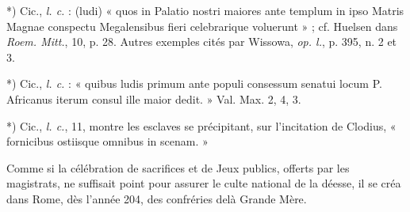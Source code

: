 \documentclass[a4paper, 11pt, oneside, polutonikogreek, french]{article}
\begin{document}
*) Cic., \emph{l. c.} : (ludi) « quos in Palatio nostri maiores ante templum in ipso Matris Magnae conspectu Megalensibus fieri celebrarique voluerunt » ; cf. Huelsen dans \emph{Roem. Mitt.}, 10, p. 28. Autres exemples cités par Wissowa, \emph{op. l.}, p. 395, n. 2 et 3.

*) Cic., \emph{l. c.} : « quibus ludis primum ante populi consessum senatui locum P. Africanus iterum consul ille maior dedit. » Val. Max. 2, 4, 3.

*) Cic., \emph{l. c.}, 11, montre les esclaves se précipitant, sur l'incitation de Clodius, « fornicibus ostiisque omnibus in scenam. »

Comme si la célébration de sacrifices et de Jeux publics, offerts par les magistrats, ne suffisait point pour assurer le culte national de la déesse, il se créa dans Rome, dès l'année 204, des confréries delà Grande Mère.
\end{document}
